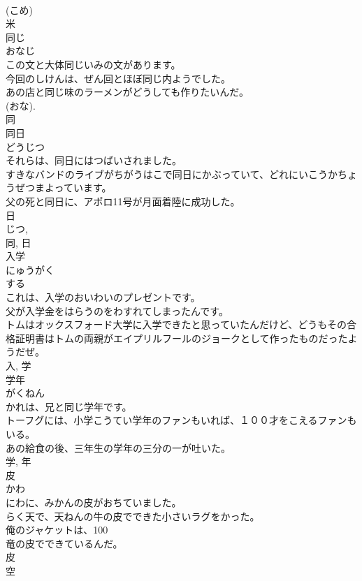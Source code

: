 \documentclass[8pt]{extreport}
\begin{document}
\begin{CJK}{UTF8}{min}
\\	(こめ) 
\\	米	
\\	同じ	
\\	おなじ	
\\	この文と大体同じいみの文があります。	
\\	今回のしけんは、ぜん回とほぼ同じ内ようでした。	
\\	あの店と同じ味のラーメンがどうしても作りたいんだ。	
\\	(おな). 
\\	同	
\\	同日	
\\	どうじつ	
\\	それらは、同日にはつばいされました。	
\\	すきなバンドのライブがちがうはこで同日にかぶっていて、どれにいこうかちょうぜつまよっています。	
\\	父の死と同日に、アポロ11号が月面着陸に成功した。	
\\	日 
\\	じつ, 
\\	同, 日	
\\	入学	
\\	にゅうがく	
\\	する 
\\	これは、入学のおいわいのプレゼントです。	
\\	父が入学金をはらうのをわすれてしまったんです。	
\\	トムはオックスフォード大学に入学できたと思っていたんだけど、どうもその合格証明書はトムの両親がエイプリルフールのジョークとして作ったものだったようだぜ。	
\\	入, 学	
\\	学年	
\\	がくねん	
\\	かれは、兄と同じ学年です。	
\\	トーフグには、小学こうてい学年のファンもいれば、１００才をこえるファンもいる。	
\\	あの給食の後、三年生の学年の三分の一が吐いた。	
\\	学, 年	
\\	皮	
\\	かわ	
\\	にわに、みかんの皮がおちていました。	
\\	らく天で、天ねんの牛の皮でできた小さいラグをかった。	
\\	俺のジャケットは、100
\\	竜の皮でできているんだ。	
\\	皮	
\\	空	

\end{CJK}
\end{document}
